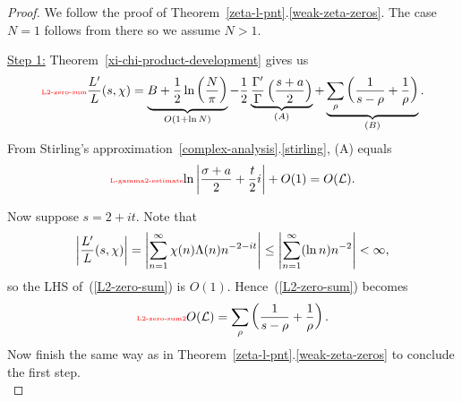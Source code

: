 \begin{proof}
We follow the proof of Theorem~\ref{zeta-l-pnt}.\ref{weak-zeta-zeros}. The case $N=1$ follows from there so we assume $N>1$. 

\noindent\underline{Step 1:}
Theorem~\ref{xi-chi-product-development} gives us
\begin{equation}\llabel{L2-zero-sum}
\frac{L'}{L}(s,\chi)=
\underbrace{B+\rc2\ln\pf{N}{\pi}}_{O(1+\ln N)}
-
\rc2\underbrace{\frac{\Ga'}{\Ga}\pa{
\frac {s+a}2}}_{(A)}+
\underbrace{\sum_{\rh} \pa{\rc{
s-\rh}+\rc{\rh}}}_{(B)}.
\end{equation}
From Stirling's approximation~\ref{complex-analysis}.\ref{stirling}, (A) equals
\begin{equation}\llabel{L-gamma2-estimate}
{\ln\ab{\frac{\si+a}{2}+\frac t2i}}%
+O(1)=O(\cal L).
\end{equation}

Now suppose $s=2+it$. 
Note that
\[
\left| {\frac{L'}{L}(s,\chi)} \right|
=\left| {\sum_{n=1}^{\infty} \chi(n)\Lambda(n)n^{-2-it}} \right|
\le \left| {\sum_{n=1}^{\infty} (\ln n)n^{-2}} \right|<\infty,
\]
so the LHS of~(\ref{L2-zero-sum}) is $O(1)$.
Hence~(\ref{L2-zero-sum}) becomes
\begin{equation}\llabel{L2-zero-sum2}
O(\cal L)=\sum_{\rh} \pa{\rc{
s-\rh}+\rc{\rh}}.
\end{equation}
Now finish the same way as in Theorem~\ref{zeta-l-pnt}.\ref{weak-zeta-zeros} to conclude the first step.\\


\end{proof}
